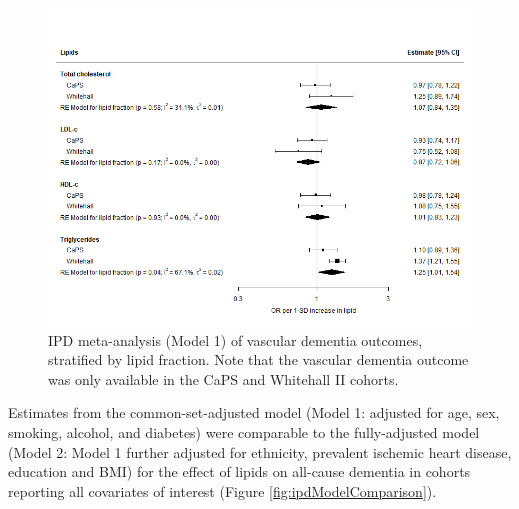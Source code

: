 \documentclass[a4paper, twoside]{templates/ociamthesis}
\begin{document}
\begin{figure}[H]
\includegraphics[width=1\linewidth]{figures/ipd/main_vasdem} \caption[IPD meta-analysis of all-cause dementia, stratified by lipid fraction]{IPD meta-analysis (Model 1) of vascular dementia outcomes, stratified by lipid fraction. Note that the vascular dementia outcome was only available in the CaPS and Whitehall II cohorts.}\label{fig:mainEffectVad}
\end{figure}

Estimates from the common-set-adjusted model (Model 1: adjusted for age, sex, smoking, alcohol, and diabetes) were comparable to the fully-adjusted model (Model 2: Model 1 further adjusted for ethnicity, prevalent ischemic heart disease, education and BMI) for the effect of lipids on all-cause dementia in cohorts reporting all covariates of interest (Figure \ref{fig:ipdModelComparison}).
\end{document}
